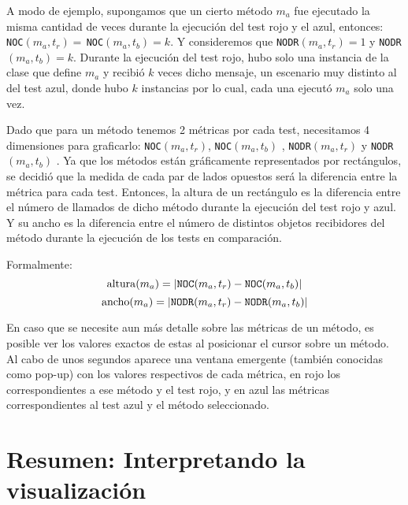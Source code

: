 \par A modo de ejemplo, supongamos que un cierto método $m_a$ fue ejecutado la misma cantidad de veces durante la ejecución del test rojo y el azul, entonces: {\tt NOC}$(m_a,t_r) = \,${\tt NOC}$(m_a,t_b) = k$. Y consideremos que {\tt NODR}$(m_a,t_r) = 1$ y {\tt NODR}$(m_a,t_b) = k$. Durante la ejecución del test rojo, hubo solo una instancia de la clase que define $m_a$ y recibió $k$ veces dicho mensaje, un escenario muy distinto al del test azul, donde hubo $k$ instancias por lo cual, cada una ejecutó $m_a$ solo una vez.

\par Dado que para un método tenemos 2 métricas por cada test, necesitamos 4 dimensiones para graficarlo: {\tt NOC}$(m_a,t_r)$, {\tt NOC}$(m_a,t_b)$ , {\tt NODR}$(m_a,t_r)$ y {\tt NODR}$(m_a,t_b)$ . Ya que los métodos están gráficamente representados por rectángulos, se decidió que la medida de cada par de lados opuestos será la diferencia entre la métrica para cada test. Entonces, la altura de un rectángulo es la diferencia entre el número de llamados de dicho método durante la ejecución del test rojo y azul. Y su ancho es la diferencia entre el número de distintos objetos recibidores del método durante la ejecución de los tests en comparación. 

\par Formalmente:
\[ {\rm altura}(m_a) = \vert {\tt NOC}(m_a,t_r) - {\tt NOC}(m_a,t_b) \vert \]
\[ {\rm ancho}(m_a) = \vert {\tt NODR}(m_a,t_r) - {\tt NODR}(m_a,t_b) \vert \]


\par En caso que se necesite aun más detalle sobre las métricas de un método, es posible ver los valores exactos de estas al posicionar el cursor sobre un método. Al cabo de unos segundos aparece una ventana emergente (también conocidas como pop-up) con los valores respectivos de cada métrica, en rojo los correspondientes a ese método y el test rojo, y en azul las métricas correspondientes al test azul y el método seleccionado.


\section{Resumen: Interpretando la visualización}


